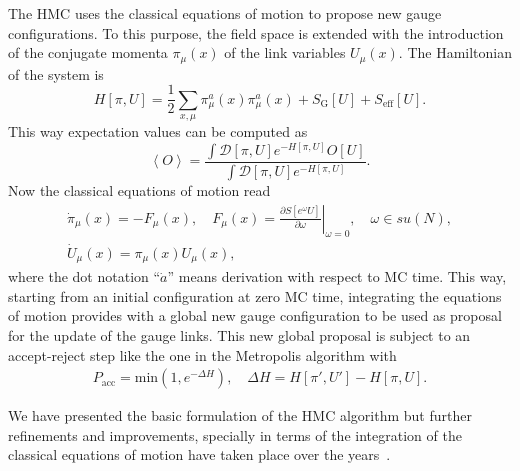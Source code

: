 The HMC uses the classical equations of motion to propose new gauge configurations. To this purpose, the field space is extended with the introduction of the conjugate momenta $\pi_{\mu}(x)$ of the link variables $U_{\mu}(x)$. The Hamiltonian of the system is
\begin{equation}
H[\pi,U]=\frac{1}{2}\sum_{x,\mu}\pi_{\mu}^a(x)\pi_{\mu}^a(x)+S_{\textrm{G}}[U]+S_{\textrm{eff}}[U].
\end{equation}
This way expectation values can be computed as
\begin{equation}
\left<O\right>=\frac{\int\mathcal{D}[\pi,U]e^{-H[\pi,U]}O[U]}{\int\mathcal{D}[\pi,U]e^{-H[\pi,U]}}.
\end{equation}
Now the classical equations of motion read
\begin{gather}
\dot{\pi}_{\mu}(x)=-F_{\mu}(x), \quad F_{\mu}(x)=\left.\frac{\partial S[e^{\omega}U]}{\partial\omega}\right|_{\omega=0}, \quad \omega\in su(N), \\
\dot{U}_{\mu}(x)=\pi_{\mu}(x)U_{\mu}(x),
\end{gather}
where the dot notation ``$\dot{a}$'' means derivation with respect to MC time. This way, starting from an initial configuration at zero MC time, integrating the equations of motion provides with a global new gauge configuration to be used as proposal for the update of the gauge links. This new global proposal is subject to an accept-reject step like the one in the Metropolis algorithm with
\begin{gather}
P_{\textrm{acc}}=\textrm{min}\left(1,e^{-\Delta H}\right), \quad \Delta H=H[\pi',U']-H[\pi,U].
\end{gather}

We have presented the basic formulation of the HMC algorithm but further refinements and improvements, specially in terms of the integration of the classical equations of motion have taken place over the years~\citep{Weingarten:1991ra,OMELYAN2003272,Hasenbusch:2001ne}.

